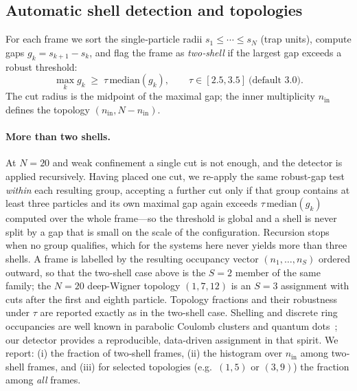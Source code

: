 \subsection{Automatic shell detection and topologies}
\label{subsec:shells}

For each frame we sort the single‐particle radii $s_1\le\cdots\le s_N$ (trap units), compute gaps
$g_k=s_{k+1}-s_k$, and flag the frame as \emph{two‐shell} if the largest gap exceeds a robust threshold:
\begin{equation}
\max_k g_k \;\ge\; \tau\,\mathrm{median}(g_k),
\qquad \tau\in[2.5,3.5]\ \text{(default 3.0)}.
\end{equation}
The cut radius is the midpoint of the maximal gap; the inner multiplicity $n_{\mathrm{in}}$ defines the topology 
$(n_{\mathrm{in}}, N-n_{\mathrm{in}})$.

\paragraph{More than two shells.} At $N{=}20$ and weak confinement a single cut is not
enough, and the detector is applied recursively. Having placed one cut, we re-apply the same
robust-gap test \emph{within} each resulting group, accepting a further cut only if that
group contains at least three particles and its own maximal gap again exceeds
$\tau\,\mathrm{median}(g_k)$ computed over the whole frame---so the threshold is global and
a shell is never split by a gap that is small on the scale of the configuration. Recursion
stops when no group qualifies, which for the systems here never yields more than three
shells. A frame is labelled by the resulting occupancy vector
$(n_1,\dots,n_S)$ ordered outward, so that the two-shell case above is the $S{=}2$ member of
the same family; the $N{=}20$ deep-Wigner topology $(1,7,12)$ is an $S{=}3$ assignment with
cuts after the first and eighth particle. Topology fractions and their robustness under
$\tau$ are reported exactly as in the two-shell case.
Shelling and discrete ring occupancies are well known in parabolic Coulomb clusters
and quantum dots~\cite{schweigert1994spectralpropertieschargedparticles,Kong_2002,manninen2007metalclustersquantumdots};
our detector provides a reproducible, data-driven assignment in that spirit.
We report:
(i) the fraction of two‐shell frames,
(ii) the histogram over $n_{\mathrm{in}}$ among two‐shell frames,
and (iii) for selected topologies (e.g.\ $(1,5)$ or $(3,9)$) the fraction among \emph{all} frames.


